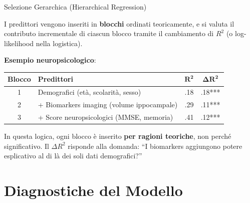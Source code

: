 \documentclass[
  ignorenonframetext,
]{beamer}
\begin{document}
\begin{frame}{Selezione Gerarchica (Hierarchical Regression)}
\label{selezione-gerarchica-hierarchical-regression}
\small

I predittori vengono inseriti in \textbf{blocchi} ordinati teoricamente,
e si valuta il contributo incrementale di ciascun blocco tramite il
cambiamento di \(R^2\) (o log-likelihood nella logistica).

\vspace{0.3em}

\textbf{Esempio neuropsicologico}:

\begin{center}
\begin{tabular}{clcc}
\toprule
\textbf{Blocco} & \textbf{Predittori} & $\boldsymbol{R^2}$ & $\boldsymbol{\Delta R^2}$ \\
\midrule
1 & Demografici (età, scolarità, sesso) & .18 & .18*** \\
2 & + Biomarkers imaging (volume ippocampale) & .29 & .11*** \\
3 & + Score neuropsicologici (MMSE, memoria) & .41 & .12*** \\
\bottomrule
\end{tabular}
\end{center}
\vspace{0.3em}

\small In questa logica, ogni blocco è inserito
\textbf{per ragioni teoriche}, non perché significativo. Il
\(\Delta R^2\) risponde alla domanda: ``I biomarkers aggiungono potere
esplicativo al di là dei soli dati demografici?''
\end{frame}

\section{Diagnostiche del Modello}\label{diagnostiche-del-modello}
\end{document}
